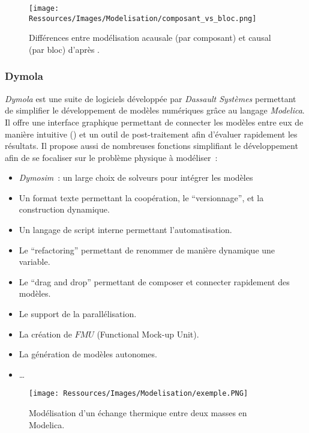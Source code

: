 \begin{figure}
    \centering
    \texttt{[image: Ressources/Images/Modelisation/composant\_vs\_bloc.png]}
    \caption{Différences entre modélisation acausale (par composant) et causal (par bloc)
             d’après .
             \label{fig:acausal_vs_causal}}
\end{figure}

\subsubsection{Dymola} %
\label{ssub:dymola}
\textit{Dymola} est une suite de logiciels développée par \textit{Dassault Systèmes}
permettant de simplifier le développement de modèles numériques grâce au langage
\textit{Modelica}. Il offre une interface graphique permettant de connecter les modèles
entre eux de manière intuitive () et un outil de
post-traitement afin d’évaluer rapidement les résultats. Il propose aussi de nombreuses fonctions
simplifiant le développement afin de se focaliser sur le problème physique à modéliser~:
\begin{itemize}
    \item \textit{Dymosim}~: un large choix de solveurs pour intégrer les modèles
    \item Un format texte permettant la coopération, le \enquote{versionnage}, et la construction dynamique.
    \item Un langage de script interne permettant l’automatisation.
    \item Le \enquote{refactoring} permettant de renommer de manière dynamique une variable.
    \item Le \enquote{drag and drop} permettant de composer et connecter rapidement des modèles.
    \item Le support de la parallélisation.
    \item La création de $FMU$ (Functional Mock-up Unit).
    \item La génération de modèles autonomes.
    \item \dots
\end{itemize}

\begin{figure}
    \centering
    \texttt{[image: Ressources/Images/Modelisation/exemple.PNG]}
    \caption{Modélisation d’un échange thermique entre deux masses en Modelica.
             \label{fig:exemple_modelica}}
\end{figure}


